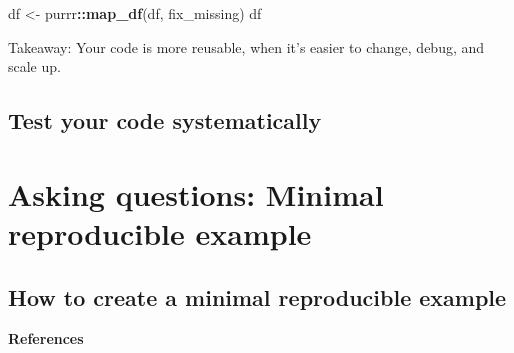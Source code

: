 \documentclass[
]{book}
\newenvironment{Shaded}{\begin{snugshade}}{\end{snugshade}}
\newcommand{\KeywordTok}[1]{\textcolor[rgb]{0.13,0.29,0.53}{\textbf{#1}}}
\newcommand{\NormalTok}[1]{#1}
\newcommand{\OperatorTok}[1]{\textcolor[rgb]{0.81,0.36,0.00}{\textbf{#1}}}
\newcommand{\StringTok}[1]{\textcolor[rgb]{0.31,0.60,0.02}{#1}}
\begin{document}
\begin{Shaded}
\begin{Highlighting}[]
\NormalTok{df <{-}}\StringTok{ }\NormalTok{purrr}\OperatorTok{::}\KeywordTok{map\_df}\NormalTok{(df, fix\_missing)}
\NormalTok{df}
\end{Highlighting}
\end{Shaded}

Takeaway: Your code is more reusable, when it's easier to change, debug, and scale up.

\hypertarget{test-your-code-systematically}{%
\subsection{Test your code systematically}\label{test-your-code-systematically}}

\hypertarget{asking-questions-minimal-reproducible-example}{%
\section{Asking questions: Minimal reproducible example}\label{asking-questions-minimal-reproducible-example}}

\hypertarget{how-to-create-a-minimal-reproducible-example}{%
\subsection{How to create a minimal reproducible example}\label{how-to-create-a-minimal-reproducible-example}}

\textbf{References}
\end{document}
